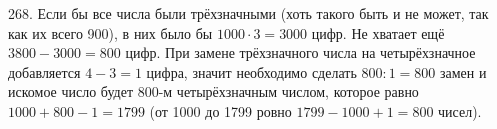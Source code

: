 268. Если бы все числа были трёхзначными (хоть такого быть и не может, так как их всего 900), в них было бы $1000\cdot3=3000$ цифр. Не хватает ещё $3800-3000=800$ цифр. При замене трёхзначного числа на четырёхзначное добавляется $4-3=1$ цифра, значит необходимо сделать $800:1=800$ замен и искомое число будет 800-м четырёхзначным числом, которое равно $1000+800-1=1799$ (от 1000 до 1799 ровно $1799-1000+1=800$ чисел).\\
